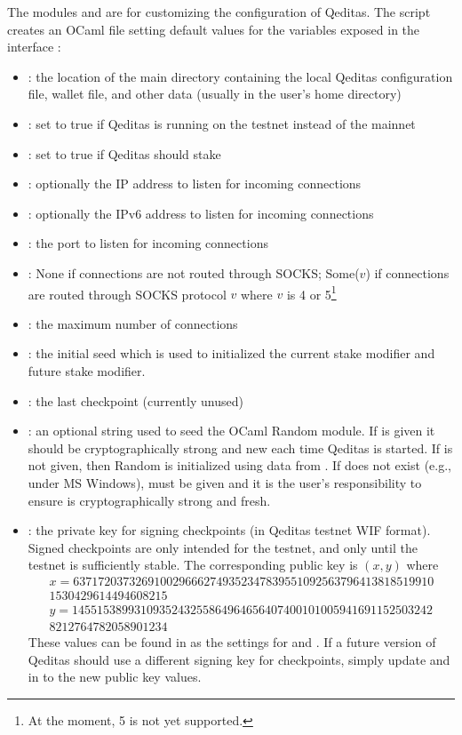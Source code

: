 The modules  and 
are for customizing the configuration of Qeditas.
The  script creates an OCaml file 
setting default values for the variables exposed in the interface :
\begin{itemize}
\item {} : the location of the main directory containing the local Qeditas configuration file, wallet file, and other data (usually  in the user's home directory)
\item {} : set to true if Qeditas is running on the testnet instead of the mainnet
\item {} : set to true if Qeditas should stake
\item {} : optionally the IP address to listen for incoming connections
\item {} : optionally the IPv6 address to listen for incoming connections
\item {} : the port to listen for incoming connections
\item {} : None if connections are not routed through SOCKS; Some($v$) if connections are routed through SOCKS protocol $v$ where $v$ is 4 or 5\footnote{At the moment, 5 is not yet supported.}
\item {} : the maximum number of connections
\item {} : the initial seed which is used to initialized the current stake modifier and future stake modifier.
\item {} : the last checkpoint (currently unused)
\item {} : an optional string used to seed the OCaml Random module. If {} is given it should be cryptographically strong and new each time Qeditas is started. If {} is not given, then Random is initialized using data from {}. If {} does not exist (e.g., under MS Windows), {} must be given and it is the user's responsibility to ensure {} is cryptographically strong and fresh.
\item {} : the private key for signing checkpoints (in Qeditas testnet WIF format). Signed checkpoints are only intended for the testnet, and only until the testnet is sufficiently stable. The corresponding public key is $(x,y)$ where
$$
\begin{array}{r}
x = 6371720373269100296662749352347839551092563796413818519910\\ 1530429614494608215 \\
y = 1455153899310935243255864964656407400101005941691152503242\\ 8212764782058901234
\end{array}
$$
These values can be found in {} as the
settings for {}
and {}.
If a future version of Qeditas should use a different signing key for checkpoints, simply update {}
and {} in {} to the new public key values.
\end{itemize}

